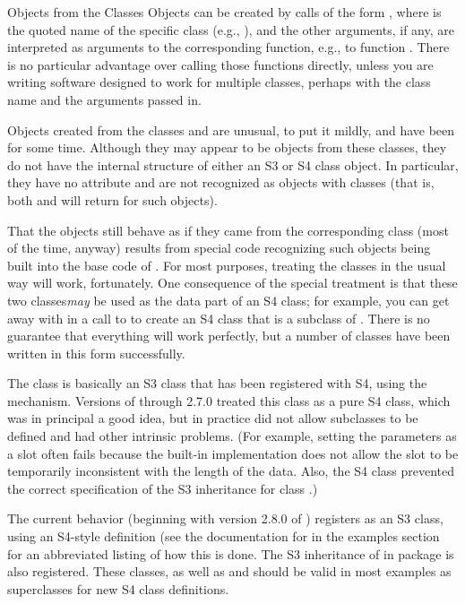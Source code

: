 \begin{Section}{Objects from the Classes}
Objects can be created by calls of the form ,
where  is the quoted name of the specific class (e.g.,
), and the other arguments, if any, are interpreted as
arguments to the corresponding function, e.g., to function
.  There is no particular advantage over calling those
functions directly, unless you are writing software designed to work
for multiple classes, perhaps with the class name and the arguments
passed in.

Objects created from the classes  and  are unusual, to put
it mildly, and have been for some time.  Although they may appear to
be objects from these classes, they do not have the internal
structure of either an S3 or S4 class object.  In particular, they
have no  attribute and are not recognized as objects
with classes (that is, both  and
 will return  for such objects).

That the objects still behave as if they came from the corresponding
class (most of the time, anyway) results from special code
recognizing such objects being built into the base code of \R{}.
For most purposes, treating the classes in the usual way will work,
fortunately.  One consequence of the special treatment is that these
two classes\emph{may} be used as the data part of an S4 class; for
example, you can get away with  in a call
to  to create an S4 class that is a subclass
of .  There is no guarantee that everything will work
perfectly, but a number of classes have been written in this form
successfully.

The class   is basically an S3 class
that has been registered with S4, using the
 mechanism.  Versions of \R{} through 2.7.0
treated this class as a pure S4 class, which was in principal a good
idea, but in practice did not allow subclasses to be defined and had
other intrinsic problems.  (For example, setting the
 parameters as a slot often fails because the built-in
implementation does not allow the slot to be temporarily
inconsistent with the length of the data. Also, the S4 class
prevented the correct specification of the S3 inheritance for class
.)

The current behavior (beginning with version 2.8.0 of \R{}) registers
 as an S3 class,  using an S4-style definition (see the
documentation for  in the examples section
for an abbreviated listing of how this is done.  The S3
inheritance of  in package  is also
registered.
These classes, as well as  and  should
be valid in most examples as superclasses for new S4 class
definitions.



\end{Section}

